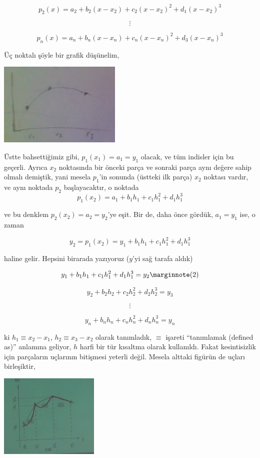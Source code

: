 \documentclass[12pt,fleqn]{article}\usepackage{../../common}
\begin{document}
$$ p_2(x)  = a_2 + b_2(x-x_2) + c_2(x-x_2)^2 + d_1(x-x_2)^3$$

$$ \vdots $$

$$ p_n(x)  = a_n + b_n(x-x_n) + c_n(x-x_n)^2 + d_3(x-x_n)^3$$

Üç noktalı şöyle bir grafik düşünelim,

\includegraphics[height=4cm]{spline2.png}

Üstte bahsettiğimiz gibi, $p_1(x_1) = a_1 = y_1$ olacak, ve tüm indisler
için bu geçerli. Ayrıca $x_2$ noktasında bir önceki parça ve sonraki parça
aynı değere sahip olmalı demiştik, yani mesela $p_1$'in sonunda (üstteki
ilk parça) $x_2$ noktası vardır, ve aynı noktada $p_2$ başlayacaktır, o
noktada $$ p_1(x_2) = a_1 + b_1h_1 + c_1h_1^2 + d_1h_1^3  $$

ve bu denklem $p_2(x_2) = a_2 = y_2$'ye eşit. Bir de, daha önce gördük, $a_1 =
y_1$ ise, o zaman 

$$ y_2 = p_1(x_2) = y_1 + b_1h_1 + c_1h_1^2 + d_1h_1^3 $$

haline gelir. Hepsini birarada yazıyoruz ($y$'yi sağ tarafa aldık)

$$ y_1 + b_1h_1 + c_1h_1^2 + d_1h_1^3 = y_2 
\mlabel{2} 
$$

$$ y_2 + b_2h_2 + c_2h_2^2 + d_2h_2^3 = y_3 $$

$$ \vdots $$

$$ y_n + b_nh_n + c_nh_n^2 + d_nh_n^3 = y_n $$

ki $h_1 \equiv x_2 - x_1$, $h_2 \equiv x_3 - x_2$ olarak tanımladık,
$\equiv$ işareti ``tanımlamak (defined as)'' anlamına geliyor, $h$
harfi bir tür kısaltma olarak kullanıldı. Fakat kesintisizlik için
parçaların uçlarının bitişmesi yeterli değil. Mesela alttaki figürün de
uçları birleşiktir,

\includegraphics[height=4cm]{spline3.png}
\end{document}

